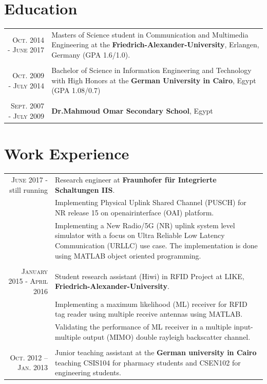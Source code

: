 \documentclass[a4paper,10pt]{article}
\begin{document}
\section{Education}
\begin{tabular}{r|p{9cm}}	
\textsc{Oct.} 2014 - \textsc{June} 2017 & Masters of Science student in Communication and Multimedia Engineering at the {\bf Friedrich-Alexander-University}, Erlangen, Germany (GPA 1.6/1.0). \\
& \\

 \textsc{Oct.} 2009 - \textsc{July} 2014 & Bachelor of Science in Information Engineering and Technology with High Honors at the {\bf German University in Cairo}, Egypt (GPA 1.08/0.7)\\
& \\
 \textsc{Sept.} 2007 - \textsc{July} 2009 & {\bf Dr.Mahmoud Omar Secondary School}, Egypt
\end{tabular}

\section{Work Experience}
\begin{tabular}{r|p{9cm}}
	\textsc{June} 2017 - still running & Research engineer at {\bf Fraunhofer für Integrierte Schaltungen IIS}.\\
	& Implementing Physical Uplink Shared Channel (PUSCH) for NR release 15 on openairinterface (OAI) platform. \\
	& Implementing a New Radio/5G (NR) uplink system level simulator with a focus on Ultra Reliable Low Latency Communication (URLLC) use case. The implementation is done using MATLAB object oriented programming.\\
	& \\	
	\textsc{January} 2015 - \textsc{April} 2016 & Student research assistant (Hiwi) in RFID Project at LIKE, {\bf Friedrich-Alexander-University}.\\
	& Implementing a maximum likelihood (ML) receiver for RFID tag reader using multiple receive antennas using MATLAB. \\
	& Validating the performance of ML receiver in a multiple input-multiple output (MIMO) double rayleigh backscatter channel. \\ 
	& \\ 
	\textsc{Oct. 2012 – Jan. 2013} & Junior teaching assistant at the {\bf German university in Cairo} teaching CSIS104 for pharmacy students and CSEN102 for engineering students. \\
\end{tabular}
\end{document}
